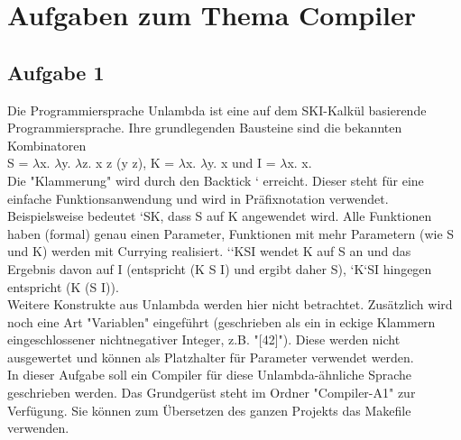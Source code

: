\documentclass{scrartcl}
\renewcommand{\l}{$\lambda$}
\begin{document}
\section*{Aufgaben zum Thema Compiler}
\subsection*{Aufgabe 1}
Die Programmiersprache Unlambda ist eine auf dem SKI-Kalkül basierende Programmiersprache. Ihre grundlegenden Bausteine sind die bekannten Kombinatoren \\S = \l x. \l y. \l z. x z (y z), K = \l x. \l y. x und I = \l x. x.\\
Die "Klammerung" wird durch den Backtick ` erreicht. Dieser steht für eine einfache Funktionsanwendung und wird in Präfixnotation verwendet. Beispielsweise bedeutet `SK, dass S auf K angewendet wird. Alle Funktionen haben (formal) genau einen Parameter, Funktionen mit mehr Parametern (wie S und K) werden mit Currying realisiert. `{}`KSI wendet K auf S an und das Ergebnis davon auf I (entspricht (K S I) und ergibt daher S), `K`SI hingegen entspricht (K (S I)).\\
Weitere Konstrukte aus Unlambda werden hier nicht betrachtet. Zusätzlich wird noch eine Art "Variablen" eingeführt (geschrieben als ein in eckige Klammern eingeschlossener nichtnegativer Integer, z.B. "[42]"). Diese werden nicht ausgewertet und können als Platzhalter für Parameter verwendet werden.\\
In dieser Aufgabe soll ein Compiler für diese Unlambda-ähnliche Sprache geschrieben werden. Das Grundgerüst steht im Ordner "Compiler-A1" zur Verfügung. Sie können zum Übersetzen des ganzen Projekts das Makefile verwenden.
\end{document}
